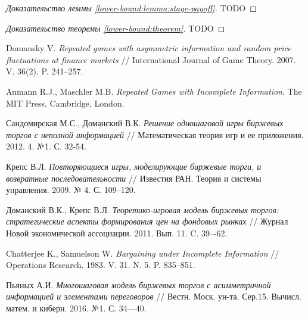 \documentclass[12pt, draft]{extarticle}
\begin{document}
\begin{proof}[Доказательство леммы \ref{lower-bound:lemma:stage-payoff}]
  TODO
\end{proof}

\begin{proof}[Доказательство теоремы \ref{lower-bound:theorem}]
  TODO
\end{proof}

\begin{thebibliography}{99}

%
  Domansky V. \emph{Repeated games with asymmetric information and random price
    fluctuations at finance markets} // International Journal of Game Theory.
  2007. V. 36(2). P. 241--257.

%
  Aumann R.J., Maschler M.B. \emph{Repeated Games with Incomplete Information}.
  The MIT Press, Cambridge, London.

%
  Сандомирская М.С., Доманский В.К. \emph{Решение одношаговой игры биржевых
    торгов с неполной информацией} // Математическая теория игр и ее приложения.
  2012. 4. №1. С. 32-54.

%
  Крепс В.Л. \emph{Повторяющиеся игры, моделирующие биржевые торги, и возвратные
    последовательности} // Известия РАН. Теория и системы управления. 2009. № 4.
  С. 109--120.

%
  Доманский В.К., Крепс В.Л. \emph{Теоретико-игровая модель биржевых торгов:
    стратегические аспекты формирования цен на фондовых рынках} // Журнал Новой
  экономической ассоциации. 2011. Вып. 11. C. 39–-62.

%
  Chatterjee K., Samuelson W. \emph{Bargaining under Incomplete Information} //
  Operations Research. 1983. V. 31. N. 5. P. 835--851.


%
  Пьяных А.И. \textit{Многошаговая модель биржевых торгов с асимметричной
    информацией и элементами переговоров} // Вестн. Моск. ун-та. Сер.15. Вычисл.
  матем. и киберн. 2016. №1. С. 34—40.
\end{thebibliography}
\end{document}
